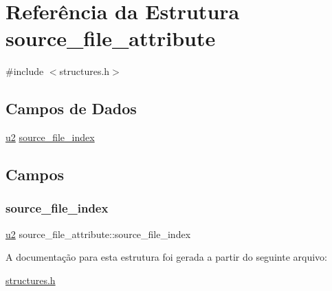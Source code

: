 \hypertarget{structsource__file__attribute}{}\section{Referência da Estrutura source\+\_\+file\+\_\+attribute}
\label{structsource__file__attribute}


{\ttfamily \#include $<$structures.\+h$>$}

\subsection*{Campos de Dados}
\begin{DoxyCompactItemize}
\item 
\hyperlink{lista__operandos_8h_a732cde1300aafb73b0ea6c2558a7a54f}{u2} \hyperlink{structsource__file__attribute_af0056307fb509ddd8301100fd2cd84d9}{source\+\_\+file\+\_\+index}
\end{DoxyCompactItemize}


\subsection{Campos}
\mbox{\label{structsource__file__attribute_af0056307fb509ddd8301100fd2cd84d9}} 
\subsubsection{\texorpdfstring{source\+\_\+file\+\_\+index}{source\_file\_index}}
{\footnotesize\ttfamily \hyperlink{lista__operandos_8h_a732cde1300aafb73b0ea6c2558a7a54f}{u2} source\+\_\+file\+\_\+attribute\+::source\+\_\+file\+\_\+index}



A documentação para esta estrutura foi gerada a partir do seguinte arquivo\+:\begin{DoxyCompactItemize}
\item 
\hyperlink{structures_8h}{structures.\+h}\end{DoxyCompactItemize}
